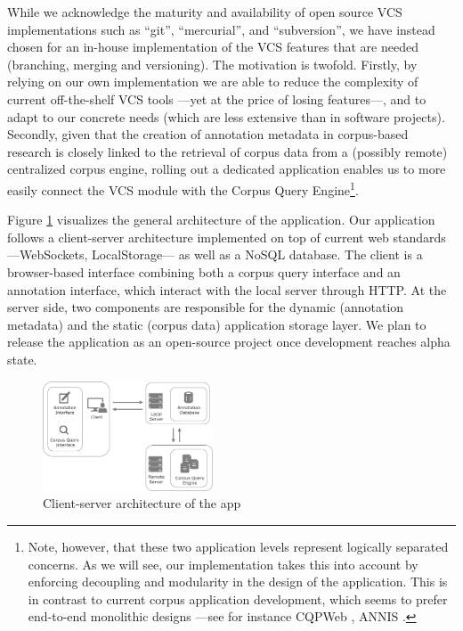 \documentclass{sig-alternate}
\begin{document}
While we acknowledge the maturity and availability of open source VCS implementations such as
``git'', ``mercurial'', and ``subversion'', we have instead chosen for an in-house implementation
of the VCS features that are needed (branching, merging and versioning). The motivation is twofold.
Firstly, by relying on our own implementation we are able to reduce the complexity of
current off-the-shelf VCS tools ---yet at the price of losing features---,
and to adapt to our concrete needs (which are less extensive than in software projects).
Secondly, given that the creation of annotation metadata in corpus-based research
is closely linked to the retrieval of corpus data from a (possibly remote) centralized corpus engine,
rolling out a dedicated application enables us to more easily connect the VCS module with the Corpus
Query Engine\footnote{
  Note, however, that these two application levels represent logically separated concerns.
  As we will see, our implementation takes this into account by enforcing decoupling and modularity
  in the design of the application. This is in contrast to current corpus application development,
  which seems to prefer end-to-end monolithic designs ---see for instance
  CQPWeb \cite{Hardie2012}, ANNIS \cite{Zeldes2009}.
}.

Figure \ref{fig:app} visualizes the general architecture of the application.
Our application follows a client-server architecture implemented on top of current web
standards ---WebSockets, LocalStorage--- as well as a NoSQL database.
The client is a browser-based interface combining both a corpus query interface and an annotation
interface, which interact with the local server through HTTP.
At the server side, two components are responsible for the dynamic (annotation
metadata) and the static (corpus data) application storage layer. We plan to release the
application as an open-source project once development reaches alpha state.

\begin{figure}
  \centering
  \includegraphics[width=0.45\textwidth]{./img/app-remote.pdf}
  \caption{\label{fig:app}Client-server architecture of the app}
\end{figure}
\end{document}
